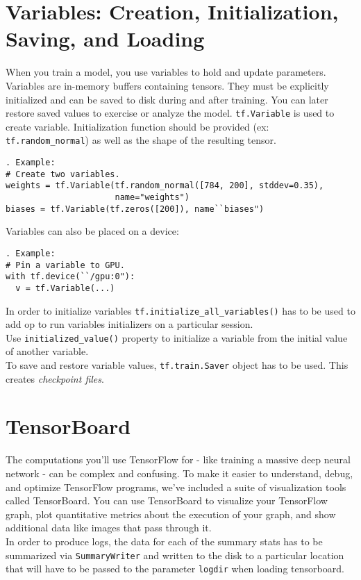 \documentclass[11pt,a4paper]{article}
\begin{document}
\section{Variables: Creation, Initialization, Saving, and Loading}
When you train a model, you use variables to hold and update parameters. Variables are in-memory buffers containing tensors. They must be explicitly initialized and can be saved to disk during and after training. You can later restore saved values to exercise or analyze the model.
\texttt{tf.Variable} is used to create variable. Initialization function should be provided (ex: \texttt{tf.random\_normal}) as well as the shape of the resulting tensor. 
\begin{lstlisting}. Example: 
# Create two variables.
weights = tf.Variable(tf.random_normal([784, 200], stddev=0.35),
                      name="weights")
biases = tf.Variable(tf.zeros([200]), name``biases")
\end{lstlisting}
Variables can also be placed on a device: 
\begin{lstlisting}. Example: 
# Pin a variable to GPU.
with tf.device(``/gpu:0"):
  v = tf.Variable(...)
\end{lstlisting} 
In order to initialize variables \texttt{tf.initialize\_all\_variables()} has to be used to add op to run variables initializers on a particular session. \\
Use \texttt{initialized\_value()} property to initialize a variable from the initial value of another variable. \\
To save and restore variable values, \texttt{tf.train.Saver} object has to be used. This creates \textit{checkpoint files}. 

\section{TensorBoard}
The computations you'll use TensorFlow for - like training a massive deep neural network - can be complex and confusing. To make it easier to understand, debug, and optimize TensorFlow programs, we've included a suite of visualization tools called TensorBoard. You can use TensorBoard to visualize your TensorFlow graph, plot quantitative metrics about the execution of your graph, and show additional data like images that pass through it. \\
In order to produce logs, the data for each of the summary stats has to be summarized via \texttt{SummaryWriter} and written to the disk to a particular location that will have to be passed to the parameter \texttt{logdir} when loading tensorboard. 
\end{document}
